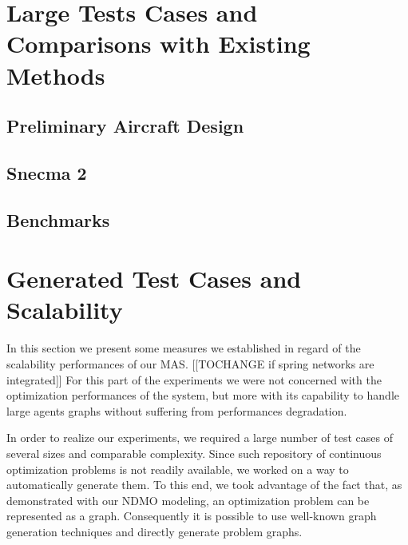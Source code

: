 \chapter{Large Tests Cases and Comparisons with Existing Methods}

\section{Preliminary Aircraft Design}

\section{Snecma 2}

\section{Benchmarks}

\chapter{Generated Test Cases and Scalability}

In this section we present some measures we established in regard of the scalability performances of our MAS. [[TOCHANGE if spring networks are integrated]] For this part of the experiments we were not concerned with the optimization performances of the system, but more with its capability to handle large agents graphs without suffering from performances degradation.

In order to realize our experiments, we required a large number of test cases of several sizes and comparable complexity.  Since such repository of continuous optimization problems is not readily available, we worked on a way to automatically generate them. To this end, we took advantage of the fact that, as demonstrated with our NDMO modeling, an optimization problem can be represented as a graph. Consequently it is possible to use well-known graph generation techniques and directly generate problem graphs.

